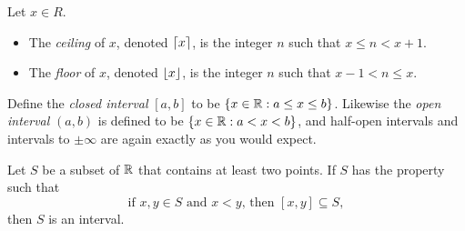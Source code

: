 \documentclass[11pt,twoside=off,numbers=noenddot]{scrbook}
\begin{document}
\begin{definition}
    Let $x \in R$.
    \begin{itemize}
        \item The \textit{ceiling} of $x$, denoted $\lceil x \rceil$, is the integer $n$ such that $x \leq n < x + 1$.
        \item The \textit{floor} of $x$, denoted $\lfloor x \rfloor$, is the integer $n$ such that $x  - 1 < n \leq x$.
    \end{itemize}
\end{definition}

\begin{definition}
    Define the \textit{closed interval} $[a, b]$ to be $\{ x \in \mathbb R : a \leq x \leq b \}$. Likewise the \textit{open interval} $(a, b)$ is defined to be $\{ x \in \mathbb R : a < x < b \}$, and half-open intervals and intervals to $\pm\infty$ are again exactly as you would expect.
\end{definition}

\begin{theorem}
    Let $S$ be a subset of $\mathbb R$ that contains at least two points. If $S$ has the property such that
    \[ \text{if $x, y \in S$ and $x < y$, then $[x, y] \subseteq S$}, \tag{1} \]
    then $S$ is an interval.
\end{theorem}
\end{document}
